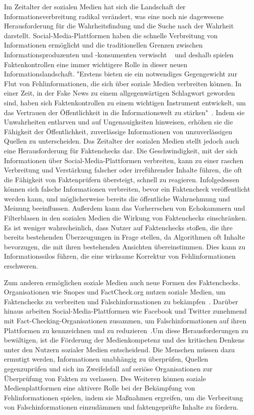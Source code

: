 \documentclass[a4paper,listof=totoc,bibliography=totoc]{scrartcl}
\begin{document}
Im Zeitalter der sozialen Medien hat sich die Landschaft der Informationsverbreitung radikal verändert, was eine noch nie dagewesene Herausforderung für 
die Wahrheitsfindung und die Suche nach der Wahrheit darstellt. Social-Media-Plattformen haben die schnelle Verbreitung von Informationen ermöglicht und 
die traditionellen Grenzen zwischen Informationsproduzenten und -konsumenten verwischt ~\cite{Vosoughi2018} und deshalb spielen Faktenkontrollen eine 
immer wichtigere Rolle in dieser neuen Informationslandschaft. "Erstens bieten sie ein notwendiges Gegengewicht zur Flut von Fehlinformationen, die sich 
über soziale Medien verbreiten können. In einer Zeit, in der Fake News zu einem allgegenwärtigen Schlagwort geworden sind, haben sich Faktenkontrollen 
zu einem wichtigen Instrument entwickelt, um das Vertrauen der Öffentlichkeit in die Informationswelt zu stärken"~\cite{lewandowsky2020}. 
Indem sie Unwahrheiten entlarven und auf Ungenauigkeiten hinweisen, erhöhen sie die Fähigkeit der Öffentlichkeit, zuverlässige Informationen von unzuverlässigen 
Quellen zu unterscheiden. Das Zeitalter der sozialen Medien stellt jedoch auch eine Herausforderung für Faktenchecks dar. Die Geschwindigkeit, mit der sich Informationen 
über Social-Media-Plattformen verbreiten, kann zu einer raschen Verbreitung und Verstärkung falscher oder irreführender Inhalte führen, die oft die Fähigkeit von 
Faktenprüfern übersteigt, schnell zu reagieren. Infolgedessen können sich falsche Informationen verbreiten, bevor ein Faktencheck veröffentlicht werden kann, und 
möglicherweise bereits die öffentliche Wahrnehmung und Meinung beeinflussen. Außerdem kann das Vorherrschen von Echokammern und Filterblasen in den sozialen 
Medien die Wirkung von Faktenchecks einschränken. Es ist weniger wahrscheinlich, dass Nutzer auf Faktenchecks stoßen, die ihre bereits bestehenden Überzeugungen 
in Frage stellen, da Algorithmen oft Inhalte bevorzugen, die mit ihren bestehenden Ansichten übereinstimmen. Dies kann zu Informationssilos führen, die eine wirksame 
Korrektur von Fehlinformationen erschweren.\newline

Zum anderen ermöglichen soziale Medien auch neue Formen des Faktenchecks. Organisationen wie Snopes und FactCheck.org nutzen soziale Medien, um 
Faktenchecks zu verbreiten und Falschinformationen zu bekämpfen~\cite{Fung2012}. Darüber hinaus arbeiten Social-Media-Plattformen wie Facebook und 
Twitter zunehmend mit Fact-Checking-Organisationen zusammen, um Falschinformationen auf ihren Plattformen zu kennzeichnen und zu reduzieren~\cite{Pennycook2020}.Um diese 
Herausforderungen zu bewältigen, ist die Förderung der Medienkompetenz und des kritischen Denkens unter den Nutzern 
sozialer Medien entscheidend. Die Menschen müssen dazu ermutigt werden, Informationen unabhängig zu überprüfen, Quellen gegenzuprüfen und sich im Zweifelsfall auf seriöse 
Organisationen zur Überprüfung von Fakten zu verlassen. Des Weiteren können soziale Medienplattformen eine aktivere Rolle bei der Bekämpfung von Fehlinformationen spielen, 
indem sie Maßnahmen ergreifen, um die Verbreitung von Falschinformationen einzudämmen und faktengeprüfte Inhalte zu fördern.
\end{document}
